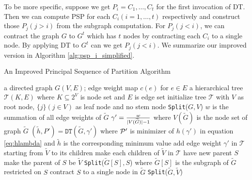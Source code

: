 \documentclass[runningheads]{llncs}
\begin{document}
To be more specific, suppose we get $P_i = {C_1, \dots, C_t}$ for the first invocation of DT. Then we can compute PSP for each $C_i(i=1,\dots, t)$ respectively and construct those $P_j(j>i)$ from the subgraph computation. For $P_j(j<i)$, we can contract the graph $G$  to $G^t$ which has $t$ nodes by contracting each $C_i$ to a single node. By applying DT to $G^t$ can we get $P_j(j<i)$. We summarize our improved version in Algorithm \ref{alg:psp_i_simplified}.

\begin{algorithm}
	\caption{An Improved Principal Sequence of Partition Algorithm}\label{alg:psp_i_simplified}
	\begin{algorithmic}[1]
		\REQUIRE a directed graph $G(V, E)$; edge weight map $c(e)$ for $e\in E$
		\ENSURE a hierarchical tree $\mathcal{T}(K, E)$ where $K \subseteq 2^{V}$ is node set and $E$ is edge set
		\STATE initialize tree $\mathcal{T}$ with $V$ as root node, $\{j\}(j \in V)$ as leaf node and no stem node
		\STATE \texttt{Split}($G, V$)
		\STATE $w$ is the summation of all edge weights of $\widetilde{G}$ 
		\STATE $\gamma' = \frac{w}{\abs{V(\widetilde{G})}-1}$ where $V(\widetilde{G})$ is the node set of graph $\widetilde{G}$ \label{alg:gamma_apostrophe}
		\STATE $(\tilde{h}, P') = \texttt{DT}(\widetilde{G}, \gamma')$ where $\P'$ is minimizer of $h(\gamma')$ in equation \eqref{eq:hlambda} and $\tilde{h}$ is the corresponding minimum value  \label{alg:DT}
		\STATE add edge weight $\gamma'$ in $\mathcal{T}$ starting from $\widetilde{V}$ to its children
		\ELSE
		\STATE make each children of $\widetilde{V}$ in $\mathcal{T}$ have new parent $S$		
		\STATE make the parent of $S$ be $\widetilde{V}$
		\STATE \texttt{Split}($\widetilde{G}[S], S$) where $\widetilde{G}[S]$ is the subgraph of $\widetilde{G}$ restricted on $S$
		\STATE contract $S$ to a single node in $\widetilde{G}$ %
		\ENDFOR 
		\STATE \texttt{Split}($\widetilde{G}, \widetilde{V}$)		
		\ENDIF
		\ENDFUNCTION
	\end{algorithmic}
\end{algorithm}
	
	
	
\end{document}
